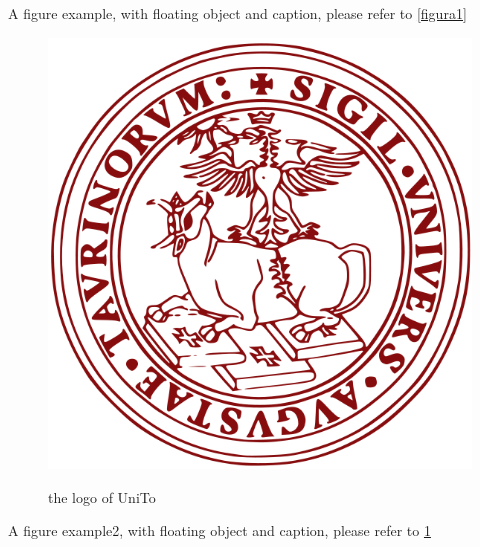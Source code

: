 A figure example, with floating object and caption, please refer to \ref{figura1}

\begin{figure}
\centering
\caption{the logo of UniTo}
\includegraphics[scale=0.15]{head/logo.png}
\label{figura2}
\end{figure}

A figure example2, with floating object and caption, please refer to \ref{figura2}
